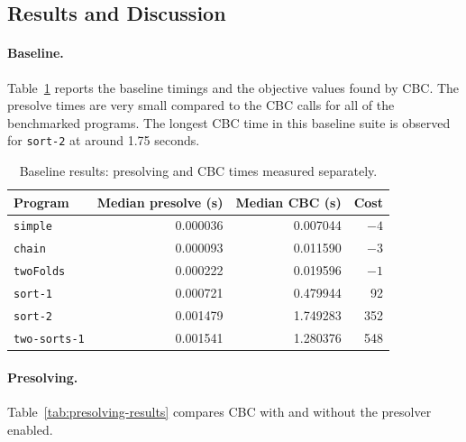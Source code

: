 \subsection{Results and Discussion}

\paragraph{Baseline.}

Table~\ref{tab:baseline-results} reports the baseline timings and the objective values found by CBC.
The presolve times are very small compared to the CBC calls for all of the benchmarked programs.
The longest CBC time in this baseline suite is observed for \texttt{sort-2} at around 1.75 seconds.

\begin{table}[htbp]
    \centering
    \begin{tabular}{lrrr}
        \hline
        Program & Median presolve (s) & Median CBC (s) & Cost \\
        \hline
        \texttt{simple}      & 0.000036 & 0.007044 & $-4$ \\
        \texttt{chain}       & 0.000093 & 0.011590 & $-3$ \\
        \texttt{twoFolds}    & 0.000222 & 0.019596 & $-1$ \\
        \texttt{sort-1}      & 0.000721 & 0.479944 & 92 \\
        \texttt{sort-2}      & 0.001479 & 1.749283 & 352 \\
        \texttt{two-sorts-1} & 0.001541 & 1.280376 & 548 \\
        \hline
    \end{tabular}
    \caption{Baseline results: presolving and CBC times measured separately.}
    \label{tab:baseline-results}
\end{table}

\FloatBarrier
\paragraph{Presolving.}

Table~\ref{tab:presolving-results} compares CBC with and without the presolver enabled.

